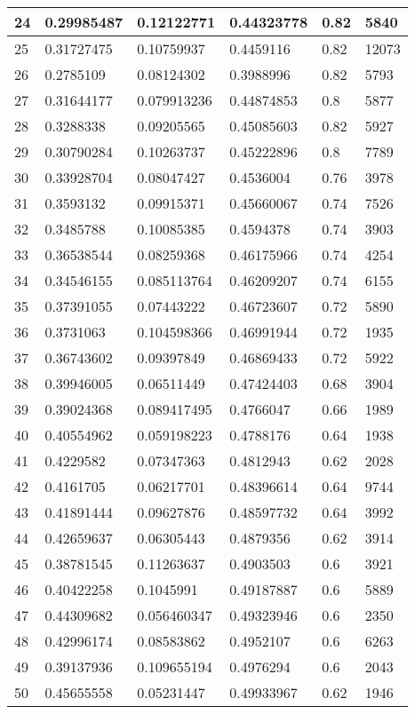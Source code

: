 \begin{longtable}{|l|l|l|l|l|l|}
24 & 0.29985487 & 0.12122771 & 0.44323778 & 0.82 & 5840 \\ \hline 
25 & 0.31727475 & 0.10759937 & 0.4459116 & 0.82 & 12073 \\ \hline 
26 & 0.2785109 & 0.08124302 & 0.3988996 & 0.82 & 5793 \\ \hline 
27 & 0.31644177 & 0.079913236 & 0.44874853 & 0.8 & 5877 \\ \hline 
28 & 0.3288338 & 0.09205565 & 0.45085603 & 0.82 & 5927 \\ \hline 
29 & 0.30790284 & 0.10263737 & 0.45222896 & 0.8 & 7789 \\ \hline 
30 & 0.33928704 & 0.08047427 & 0.4536004 & 0.76 & 3978 \\ \hline 
31 & 0.3593132 & 0.09915371 & 0.45660067 & 0.74 & 7526 \\ \hline 
32 & 0.3485788 & 0.10085385 & 0.4594378 & 0.74 & 3903 \\ \hline 
33 & 0.36538544 & 0.08259368 & 0.46175966 & 0.74 & 4254 \\ \hline 
34 & 0.34546155 & 0.085113764 & 0.46209207 & 0.74 & 6155 \\ \hline 
35 & 0.37391055 & 0.07443222 & 0.46723607 & 0.72 & 5890 \\ \hline 
36 & 0.3731063 & 0.104598366 & 0.46991944 & 0.72 & 1935 \\ \hline 
37 & 0.36743602 & 0.09397849 & 0.46869433 & 0.72 & 5922 \\ \hline 
38 & 0.39946005 & 0.06511449 & 0.47424403 & 0.68 & 3904 \\ \hline 
39 & 0.39024368 & 0.089417495 & 0.4766047 & 0.66 & 1989 \\ \hline 
40 & 0.40554962 & 0.059198223 & 0.4788176 & 0.64 & 1938 \\ \hline 
41 & 0.4229582 & 0.07347363 & 0.4812943 & 0.62 & 2028 \\ \hline 
42 & 0.4161705 & 0.06217701 & 0.48396614 & 0.64 & 9744 \\ \hline 
43 & 0.41891444 & 0.09627876 & 0.48597732 & 0.64 & 3992 \\ \hline 
44 & 0.42659637 & 0.06305443 & 0.4879356 & 0.62 & 3914 \\ \hline 
45 & 0.38781545 & 0.11263637 & 0.4903503 & 0.6 & 3921 \\ \hline 
46 & 0.40422258 & 0.1045991 & 0.49187887 & 0.6 & 5889 \\ \hline 
47 & 0.44309682 & 0.056460347 & 0.49323946 & 0.6 & 2350 \\ \hline 
48 & 0.42996174 & 0.08583862 & 0.4952107 & 0.6 & 6263 \\ \hline 
49 & 0.39137936 & 0.109655194 & 0.4976294 & 0.6 & 2043 \\ \hline 
50 & 0.45655558 & 0.05231447 & 0.49933967 & 0.62 & 1946 \\ \hline 
\end{longtable}